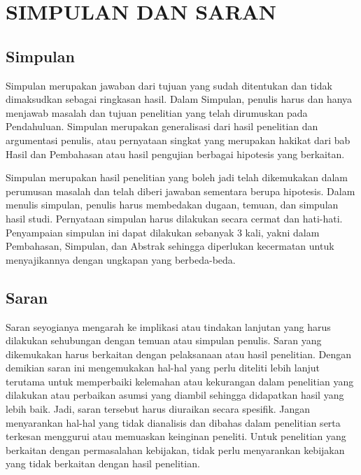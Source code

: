 
\chapter{SIMPULAN DAN SARAN}


\section{Simpulan}

Simpulan merupakan jawaban dari tujuan yang sudah ditentukan dan tidak
dimaksudkan sebagai ringkasan hasil.
Dalam Simpulan, penulis harus dan hanya menjawab masalah dan tujuan penelitian
yang telah dirumuskan pada Pendahuluan.
Simpulan merupakan generalisasi dari hasil penelitian dan argumentasi penulis,
atau pernyataan singkat yang merupakan hakikat dari bab Hasil dan Pembahasan
atau hasil pengujian berbagai hipotesis yang berkaitan.

Simpulan merupakan hasil penelitian yang boleh jadi telah dikemukakan dalam
perumusan masalah dan telah diberi jawaban sementara berupa hipotesis.
Dalam menulis simpulan, penulis harus membedakan dugaan, temuan, dan simpulan
hasil studi.
Pernyataan simpulan harus dilakukan secara cermat dan hati-hati.
Penyampaian simpulan ini dapat dilakukan sebanyak 3 kali, yakni dalam
Pembahasan, Simpulan, dan Abstrak sehingga diperlukan kecermatan untuk
menyajikannya dengan ungkapan yang berbeda-beda.


\section{Saran}

Saran seyogianya mengarah ke implikasi atau tindakan lanjutan yang harus
dilakukan sehubungan dengan temuan atau simpulan penulis.
Saran yang dikemukakan harus berkaitan dengan pelaksanaan atau hasil penelitian.
Dengan demikian saran ini mengemukakan hal-hal yang perlu diteliti lebih lanjut
terutama untuk memperbaiki kelemahan atau kekurangan dalam penelitian yang
dilakukan atau perbaikan asumsi yang diambil sehingga didapatkan hasil yang
lebih baik.
Jadi, saran tersebut harus diuraikan secara spesifik.
Jangan menyarankan hal-hal yang tidak dianalisis dan dibahas dalam penelitian
serta terkesan menggurui atau memuaskan keinginan peneliti.
Untuk penelitian yang berkaitan dengan permasalahan kebijakan, tidak perlu
menyarankan kebijakan yang tidak berkaitan dengan hasil penelitian.
